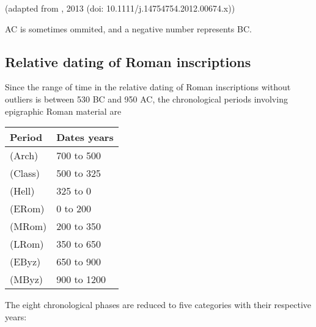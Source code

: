 \documentclass[a4paper,12pt,english]{sphinxhowto}
\begin{document}
(adapted from , 2013 (doi: 10.1111/j.1475\sphinxhyphen{}4754.2012.00674.x))


AC is sometimes ommited, and a negative number represents BC.



\subsection{Relative dating of Roman inscriptions}
\label{\detokenize{Time:relative-dating-of-roman-inscriptions}}\label{\detokenize{Time:edhrd}}
Since the range of time in the relative dating of Roman inscriptions without outliers is between 530 BC and 950 AC,
the chronological periods involving epigraphic Roman material are


\begin{savenotes}\sphinxattablestart
\raggedright
\begin{tabulary}{\linewidth}[t]{|T|T|}
\hline
\sphinxstyletheadfamily 
Period
&\sphinxstyletheadfamily 
Dates years
\\
\hline
{}  (Arch)
&
\sphinxhyphen{}700 to \sphinxhyphen{}500
\\
\hline
{} (Class)
&
\sphinxhyphen{}500 to \sphinxhyphen{}325
\\
\hline
{}  (Hell)
&
\sphinxhyphen{}325 to 0
\\
\hline
{}  (ERom)
&
0 to 200
\\
\hline
{}  (MRom)
&
200 to 350
\\
\hline
{}  (LRom)
&
350 to 650
\\
\hline
{} (EByz)
&
650 to 900
\\
\hline
{} (MByz)
&
900 to 1200
\\
\hline
\end{tabulary}
\par
\sphinxattableend\end{savenotes}


The eight chronological phases are reduced to five categories with their respective years:
\end{document}
